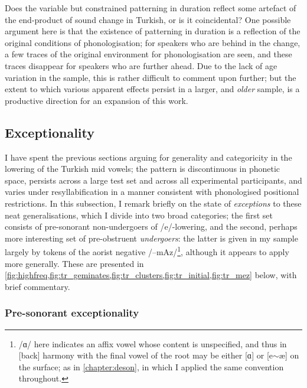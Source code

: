 Does the variable but constrained patterning in duration reflect some artefact of the end-product of sound change in Turkish, or is it coincidental? One possible argument here is that the existence of patterning in duration is a reflection of the original conditions of phonologisation; for speakers who are behind in the change, a few traces of the original environment for phonologisation are seen, and these traces disappear for speakers who are further ahead. Due to the lack of age variation in the sample, this is rather difficult to comment upon further; but the extent to which various apparent effects persist in a larger, and \emph{older} sample, is a productive direction for an expansion of this work.

\subsection{Exceptionality}\label{ss:trexceptions}

I have spent the previous sections arguing for generality and categoricity in the lowering of the Turkish mid vowels; the pattern is discontinuous in phonetic space, persists across a large test set and across all experimental participants, and varies under resyllabification in a manner consistent with phonologised positional restrictions. In this subsection, I remark briefly on the state of \emph{exceptions} to these neat generalisations, which I divide into two broad categories; the first set consists of pre-sonorant non-undergoers of /e/-lowering, and the second, perhaps more interesting set of pre-obstruent \emph{undergoers}: the latter is given in my sample largely by tokens of the aorist negative /–mAz/\footnote{/ɑ/ here indicates an affix vowel whose content is unspecified, and thus in [back] harmony with the final vowel of the root may be either [ɑ] or [e$\sim$æ] on the surface; as in \cref{chapter:deson}, in which I applied the same convention throughout.}, although it appears to apply more generally. These are presented in \cref{fig:highfreq,fig:tr_geminates,fig:tr_clusters,fig:tr_initial,fig:tr_mez} below, with brief commentary.

\subsubsection{Pre-sonorant exceptionality}


